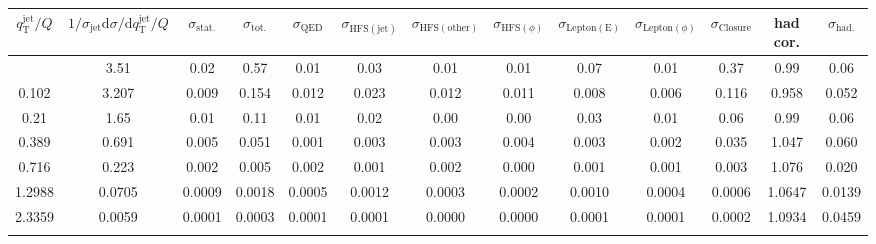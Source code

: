 \begin{table}[h!]\n\centering\n\begin{adjustbox}{width=1\textwidth}\n\begin{tabular}{| c | c | c | c || c | c | c | c | c | c | c || c | c |}\n\hline\n$q_\mathrm{T}^\mathrm{jet}/Q$&$1/\sigma_\mathrm{jet}\mathrm{d}\sigma/\mathrm{d}q_\mathrm{T}^\mathrm{jet}/Q$& $\sigma_\mathrm{stat.}$& $\sigma_\mathrm{tot.}$&$\sigma_\mathrm{QED}$&$\sigma_\mathrm{HFS(jet)}$&$\sigma_\mathrm{HFS(other)}$ &$\sigma_{\mathrm{HFS}(\phi)}$&$\sigma_\mathrm{Lepton(E)}$&$\sigma_{\mathrm{Lepton}(\phi)}$&$\sigma_\mathrm{Closure}$ & had cor. & $\sigma_\mathrm{had.}$\\
\hline\n0.03&3.51&0.02&0.57&0.01&0.03&0.01&0.01&0.07&0.01&0.37&0.99&0.06 \\
0.102&3.207&0.009&0.154&0.012&0.023&0.012&0.011&0.008&0.006&0.116&0.958&0.052 \\
0.21&1.65&0.01&0.11&0.01&0.02&0.00&0.00&0.03&0.01&0.06&0.99&0.06 \\
0.389&0.691&0.005&0.051&0.001&0.003&0.003&0.004&0.003&0.002&0.035&1.047&0.060 \\
0.716&0.223&0.002&0.005&0.002&0.001&0.002&0.000&0.001&0.001&0.003&1.076&0.020 \\
1.2988&0.0705&0.0009&0.0018&0.0005&0.0012&0.0003&0.0002&0.0010&0.0004&0.0006&1.0647&0.0139 \\
2.3359&0.0059&0.0001&0.0003&0.0001&0.0001&0.0000&0.0000&0.0001&0.0001&0.0002&1.0934&0.0459 \\
\hline\n\end{tabular}\n\end{adjustbox}\n\end{table}\n